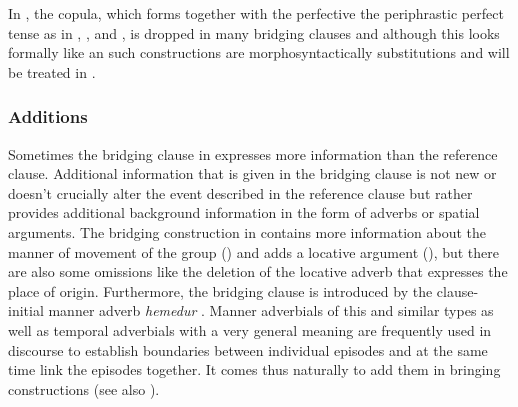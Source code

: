 \documentclass[output=paper]{LSP/langsci}
\begin{document}
In , the copula, which forms together with the perfective  the periphrastic perfect tense as in , , and , is dropped in many bridging clauses and although this looks formally like an  such constructions are morphosyntactically substitutions and will be treated in .  

\subsubsection{Additions}
\label{ssec:Additions}
Sometimes the bridging clause in  expresses more information than the reference clause. Additional information that is given in the bridging clause is not new or doesn't crucially alter the event described in the reference clause but rather provides additional background information in the form of adverbs or spatial arguments. 
The bridging construction in  contains more information about the manner of movement of the group () and adds a locative argument (), but there are also some omissions like the deletion of the locative adverb that expresses the place of origin. Furthermore, the bridging clause is introduced by the clause-initial manner adverb \textit{hemedur} . Manner adverbials of this and similar types as well as temporal adverbials with a very general meaning are frequently used in  discourse to establish boundaries between individual episodes and at the same time link the episodes together. It comes thus naturally to add them in bringing constructions (see also ).
\end{document}
